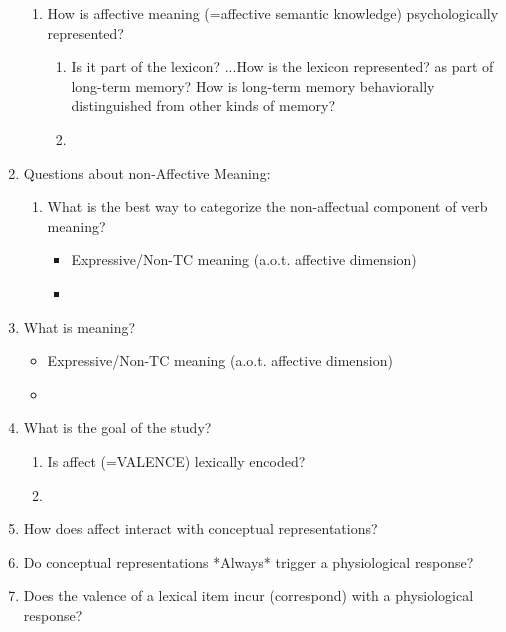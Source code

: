 \documentclass[12pt,letterpaper,table,svgnames,dvipsnames]{article}
\begin{document}
\begin{enumerate}[noitemsep]
\begin{enumerate}[noitemsep]
            \item How is affective meaning (=affective semantic knowledge) psychologically represented?   
                \begin{enumerate}[noitemsep]
                    \item Is it part of the lexicon?
                        ...How is the lexicon represented? as part of long-term memory? How is long-term memory behaviorally distinguished from other kinds of memory?
                    \item 
                \end{enumerate}
            
        \end{enumerate}   
            
        \item Questions about non-Affective Meaning:
            \begin{enumerate}[noitemsep]
                \item What is the best way to categorize the non-affectual component of verb meaning?
                    \begin{itemize}[noitemsep]
                        \item Expressive/Non-TC meaning (a.o.t. affective dimension)
                        \item 
                    \end{itemize}
            \end{enumerate}    
            
            \item What is meaning?
                \begin{itemize}[noitemsep]
                    \item Expressive/Non-TC meaning (a.o.t. affective dimension)
                    \item 
                \end{itemize}
                
            \item What is the goal of the study?
                \begin{enumerate}[noitemsep]
                    \item Is affect (=VALENCE) lexically encoded?
                    \item 
                \end{enumerate}
           
            
            
            \item How does affect interact with conceptual representations?
            \item Do conceptual representations *Always* trigger a physiological response?
            \item Does the valence of a lexical item incur (correspond) with a physiological response?


            
        \end{enumerate}
\end{document}
